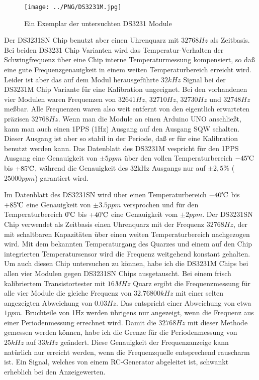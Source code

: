 \begin{figure}[H]
\centering
\texttt{[image: ../PNG/DS3231M.jpg]}
\caption{Ein Exemplar der untersuchten DS3231 Module}
\label{fig:DS3231M}
\end{figure}

Der DS3231SN Chip benutzt aber einen Uhrenquarz mit \(32768Hz\) als Zeitbasis.
Bei beiden DS3231 Chip Varianten wird das Temperatur-Verhalten der Schwingfrequenz über eine Chip interne Temperaturmessung
kompensiert, so daß eine gute Frequenzgenauigkeit in einem weiten Temperaturbereich erreicht wird.
Leider ist aber das auf dem Modul herausgeführte \(32kHz\) Signal bei der DS3231M Chip Variante für eine
Kalibration ungeeignet. Bei den vorhandenen vier Modulen waren Frequenzen von \(32641Hz\), \(32710Hz\), \(32730Hz\) und \(32748Hz\) meßbar.
Alle Frequenzen waren also weit entfernt von den eigentlich erwarteten präzisen \(32768Hz\).
Wenn man die Module an einen Arduino UNO anschließt, kann man auch einen 1PPS (1Hz) Ausgang auf den Ausgang SQW schalten.
Dieser Ausgang ist aber so stabil in der Periode, daß er für eine Kalibration benutzt werden kann.
Das Datenblatt des DS3231M vespricht für den 1PPS Ausgang eine Genauigkeit von \(\pm 5ppm\) über den vollen Temperaturbereich
\(-45\celsius\)  bis \(+85\celsius\), während die Genauigkeit des 32kHz Ausgangs nur auf \(\pm 2,5\%\) (\(25000ppm\)) garantiert wird.


Im Datenblatt des DS3231SN wird über einen Temperaturbereich \(-40\celsius\)  bis \(+85\celsius\)  eine Genauigkeit von \(\pm 3.5ppm\)
versprochen und für den Temperaturbereich \(0\celsius\)  bis \(+40\celsius\)  eine Genauigkeit vom \(\pm 2ppm\).
Der DS3231SN Chip verwendet als Zeitbasis einen Uhrenquarz mit der Frequenz \(32768Hz\), der mit schaltbaren Kapazitäten
über einen weiten Temperaturbereich nachgezogen wird. Mit dem bekannten Temperaturgang des Quarzes und einem
auf den Chip integrierten Temperatursensor wird die Frequenz weitgehend konstant gehalten.
Um auch diesen Chip untersuchen zu können, habe ich die DS3231M Chips bei allen vier Modulen gegen DS3231SN Chips
ausgetauscht. Bei einem frisch kalibriertem Transistortester mit \(16MHz\) Quarz ergibt die Frequenzmessung für alle
vier Module die gleiche Frequenz von \(32.76800kHz\) mit einer selten angezeigten Abweichung von \(0.03Hz\).
Das entspricht einer Abweichung von etwa \(1ppm\).
Bruchteile von 1Hz werden übrigens nur angezeigt, wenn die Frequenz aus einer Periodenmessung errechnet wird.
Damit die \(32768Hz\) mit dieser Methode gemessen werden können, habe ich die Grenze für die Periodenmessung
von \(25kHz\) auf \(33kHz\) geändert.
Diese Genauigkeit der Frequenzanzeige kann natürlich nur erreicht werden, wenn die Frequenzquelle entsprechend rauscharm ist.
Ein Signal, welches von einem RC-Generator abgeleitet ist, schwankt erheblich bei den Anzeigewerten.
